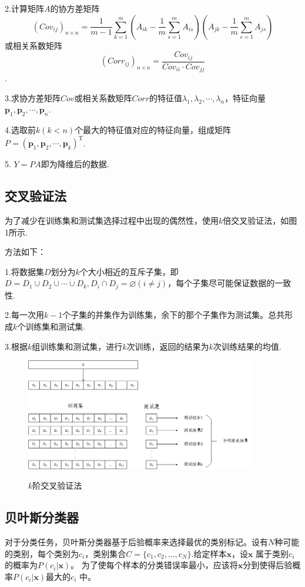 \documentclass{ctexart}
\begin{document}
2.计算矩阵$A$的协方差矩阵
$$(Cov_{ij})_{n\times n}=\frac{1}{m-1}\sum_{k=1}^{m}\left(A_{ik}-\frac{1}{m}\sum_{s=1}^{m}A_{is}\right)\left(A_{jk}-\frac{1}{m}\sum_{s=1}^{m}A_{js}\right)$$
或相关系数矩阵
$$(Corr_{ij})_{n\times n}=\frac{Cov_{ij}}{Cov_{ii}\cdot Cov_{jj}}$$.

3.求协方差矩阵$Cov$或相关系数矩阵$Corr$的特征值$\lambda_{1},\lambda_{2},\cdots ,\lambda_{n}$，特征向量$\bm{p}_{1},\bm{p}_{2},\cdots,\bm{p}_{n}$.

4.选取前$k(k<n)$个最大的特征值对应的特征向量，组成矩阵$P=(\bm{p}_{1},\bm{p}_{2},\cdots,\bm{p}_{k})^\mathrm{T}$.

5. $Y=PA$即为降维后的数据.

\subsection{交叉验证法}
为了减少在训练集和测试集选择过程中出现的偶然性，使用$k$倍交叉验证法，如图1所示.

方法如下：

1.将数据集$D$划分为$k$个大小相近的互斥子集，即$D=D_{1}\cup D_{2} \cup \cdots \cup D_{k},D_{i}\cap D_{j}=\varnothing (i\neq j)$，每个子集尽可能保证数据的一致性.

2.每一次用$k-1$个子集的并集作为训练集，余下的那个子集作为测试集。总共形成$k$个训练集和测试集.

3.根据$k$组训练集和测试集，进行$k$次训练，返回的结果为$k$次训练结果的均值.
\begin{figure}[!h]
  \centering
  \includegraphics[width=10cm]{crossva.png}\\
  \caption{{\fangsong $k$阶交叉验证法}}
\end{figure}

\subsection{贝叶斯分类器}

对于分类任务，贝叶斯分类器基于后验概率来选择最优的类别标记。设有$N$种可能的类别，每个类别为$c_{i}$，类别集合$C=\{c_{1},c_{2},...,c_{N}\}$.给定样本$\bm{x}$，设$\bm{x}$ 属于类别$c_{i}$ 的概率为$P(c_{i}|\bm{x})$。 为了使每个样本的分类错误率最小，应该将$\bm{x}$分到使得后验概率$P(c_{i}|\bm{x})$最大的$c_{i}$ 中。
\end{document}
